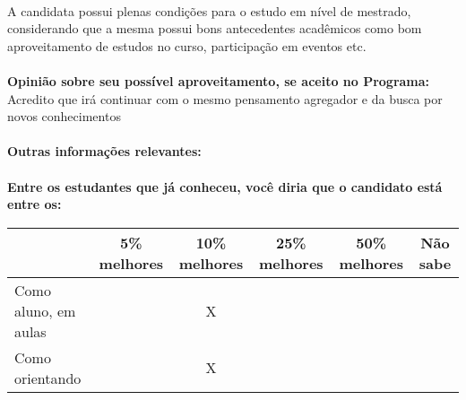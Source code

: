 \documentclass[11pt]{article}
\begin{document}
\\A candidata possui plenas condições para o estudo em nível de mestrado, considerando que a mesma possui bons antecedentes acadêmicos como bom aproveitamento de estudos no curso, participação em eventos etc.\\
\\
\textbf{Opinião sobre seu possível aproveitamento, se aceito no Programa:}
\\Acredito que irá continuar com o mesmo pensamento agregador e da busca por novos conhecimentos\\ 
\\
\textbf{Outras informações relevantes:} \\
\\[0.3cm]
\textbf{Entre os estudantes que já conheceu, você diria que o candidato está entre os:}
\\
\begin{tabular}{|l|c|c|c|c|c|}
\hline
 & 5\% melhores & 10\% melhores & 25\% melhores & 50\% melhores & Não sabe \\
\hline
Como aluno, em aulas &  & X &  &  & \\
\hline
Como orientando &  & X &  &  & \\
\hline
\end{tabular}
\end{document}
